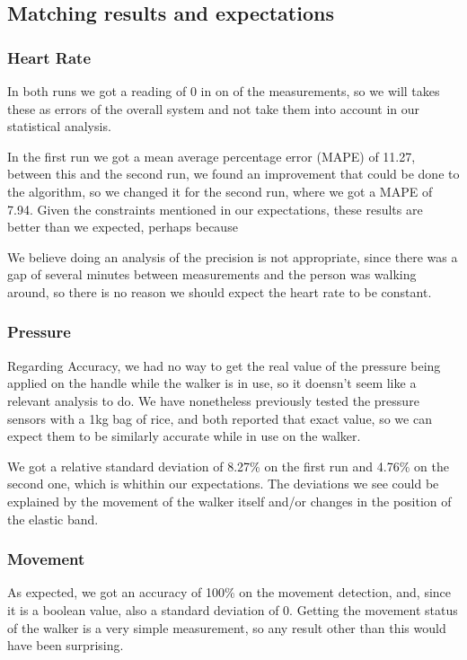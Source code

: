 	\subsection{Matching results and expectations}
		\subsubsection{Heart Rate}
			In both runs we got a reading of 0 in on of the measurements, so we will takes these as errors of the overall system and not take them into account in our statistical analysis.

			In the first run we got a mean average percentage error (MAPE) of 11.27, between this and the second run, we found an improvement that could be done to the algorithm, so we changed it for the second run, where we got a MAPE of 7.94. Given the constraints mentioned in our expectations, these results are better than we expected, perhaps because %

			We believe doing an analysis of the precision is not appropriate, since there was a gap of several minutes between measurements and the person was walking around, so there is no reason we should expect the heart rate to be constant.

		\subsubsection{Pressure}
			Regarding Accuracy, we had no way to get the real value of the pressure being applied on the handle while the walker is in use, so it doensn't seem like a relevant analysis to do. We have nonetheless previously tested the pressure sensors with a 1kg bag of rice, and both reported that exact value, so we can expect them to be similarly accurate while in use on the walker.

			We got a relative standard deviation of 8.27\% on the first run and 4.76\% on the second one, which is whithin our expectations. The deviations we see could be explained by the movement of the walker itself and/or changes in the position of the elastic band.

		\subsubsection{Movement}
			As expected, we got an accuracy of 100\% on the movement detection, and, since it is a boolean value, also a standard deviation of 0. Getting the movement status of the walker is a very simple measurement, so any result other than this would have been surprising.


